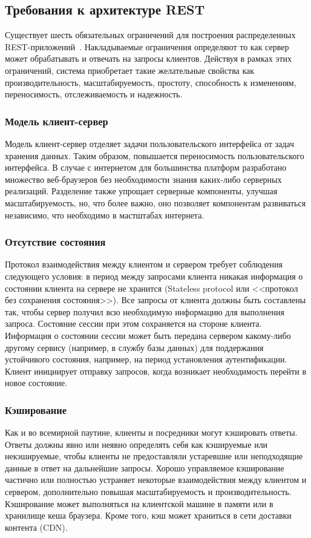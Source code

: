 \documentclass[a4page]{article}
\begin{document}
\subsection{Требования к архитектуре REST}
Существует шесть обязательных ограничений для построения распределенных REST-приложений~\cite{RESTful}.
Накладываемые ограничения определяют то как сервер может обрабатывать и отвечать на запросы клиентов.
Действуя в рамках этих ограничений,
система приобретает такие желательные свойства как производительность,
масштабируемость, простоту, способность к изменениям, переносимость, отслеживаемость и надежность.

\subsubsection{Модель клиент-сервер}
Модель клиент-сервер отделяет задачи пользовательского интерфейса от задач хранения данных.
Таким образом, повышается переносимость пользовательского интерфейса.
В случае с интернетом для большинства платформ разработано множество веб-браузеров
без необходимости знания каких-либо серверных реализаций.
Разделение также упрощает серверные компоненты, улучшая масштабируемость,
но, что более важно, оно позволяет компонентам развиваться независимо,
что необходимо в мастштабах интернета.

\subsubsection{Отсутствие состояния}
Протокол взаимодействия между клиентом и сервером требует соблюдения следующего условия:
в период между запросами клиента никакая информация о состоянии клиента на сервере не хранится
(Stateless protocol или <<протокол без сохранения состояния>>).
Все запросы от клиента должны быть составлены так,
чтобы сервер получил всю необходимую информацию для выполнения запроса.
Состояние сессии при этом сохраняется на стороне клиента.
Информация о состоянии сессии может быть передана сервером какому-либо другому сервису
(например, в службу базы данных) для поддержания устойчивого состояния,
например, на период установления аутентификации.
Клиент инициирует отправку запросов, когда возникает необходимость перейти в новое состояние.

\subsubsection{Кэширование}
Как и во всемирной паутине, клиенты и посредники могут кэшировать ответы.
Ответы должны явно или неявно определять себя как кэшируемые или некэшируемые,
чтобы клиенты не предоставляли устаревшие или неподходящие данные в ответ на дальнейшие запросы.
Хорошо управляемое кэширование частично или полностью устраняет некоторые взаимодействия
между клиентом и сервером, дополнительно повышая масштабируемость и производительность.
Кэширование может выполняться на клиентской машине в памяти или в хранилище кеша браузера.
Кроме того, кэш может храниться в сети доставки контента (CDN).
\end{document}
